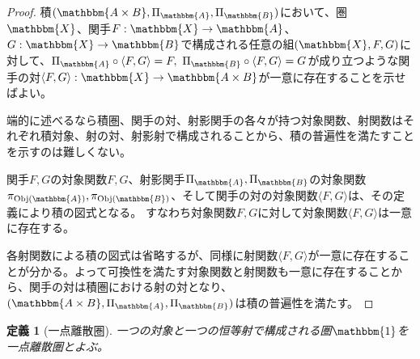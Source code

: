 \documentclass[uplatex,dvipdfmx]{jsarticle}
\newcommand{\cat}[1]{\mathbbm{#1}}
\newcommand{\arrow}{\rightarrow}
\newcommand{\functor}[3]{#1:\cat{#2}\arrow \cat{#3}}
\newcommand{\tuple}[1]{\langle #1\rangle}
\newcommand{\obj}[1]{\mathrm{Obj}(\cat{#1})}
\newtheorem{proof}{証明}[section]
\newtheorem{define}[proof]{定義}
\numberwithin{proof}{subsection}
\begin{document}
	\begin{proof}
		積$(\cat{A\times B},\Pi_\cat{A},\Pi_\cat{B})$において、圏$\cat{X}$、関手$\functor{F}{X}{A}$、$\functor{G}{X}{B}$で構成される任意の組$(\cat{X},F,G)$に対して、$\Pi_\cat{A}\circ\tuple{F,G}=F,\ \Pi_\cat{B}\circ\tuple{F,G}=G$が成り立つような関手の対$\functor{\tuple{F,G}}{X}{A\times B}$が一意に存在することを示せばよい。
		\begin{center}
		\end{center}
		端的に述べるなら積圏、関手の対、射影関手の各々が持つ対象関数、射関数はそれぞれ積対象、射の対、射影射で構成されることから、積の普遍性を満たすことを示すのは難しくない。

		関手$F,G$の対象関数$F,G$、射影関手$\Pi_\cat{A},\Pi_\cat{B}$の対象関数$\pi_{\obj{A}},\pi_{\obj{B}}$、そして関手の対の対象関数$\tuple{F,G}$は、その定義により積の図式となる。
		すなわち対象関数$F,G$に対して対象関数$\tuple{F,G}$は一意に存在する。
		\begin{center}
		\end{center}
		各射関数による積の図式は省略するが、同様に射関数$\tuple{F,G}$が一意に存在することが分かる。よって可換性を満たす対象関数と射関数も一意に存在することから、関手の対は積圏における射の対となり、$(\cat{A\times B},\Pi_\cat{A},\Pi_\cat{B})$は積の普遍性を満たす。
	\end{proof}
	\begin{define}[一点離散圏]
	一つの対象と一つの恒等射で構成される圏$\cat{1}$を一点離散圏とよぶ。
	\end{define}
\end{document}
